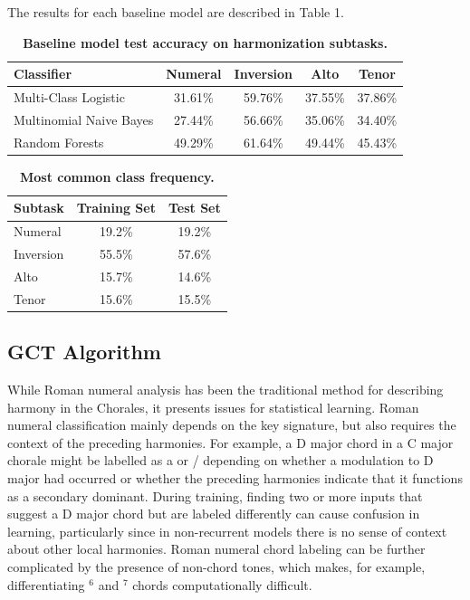 \documentclass[11pt]{article}
\begin{document}
The results for each baseline model are described in Table 1. \\

\begin{table}[h]
\begin{center}
\caption[Table caption text]{\textbf{Baseline model test accuracy on harmonization subtasks.}}
\begin{tabular}{l | c c c c}
Classifier & Numeral & Inversion & Alto & Tenor \\ \hline
Multi-Class Logistic & 31.61\% & 59.76\% & 37.55\% & 37.86\% \\
Multinomial Naive Bayes & 27.44\% & 56.66\% & 35.06\% & 34.40\% \\
Random Forests & 49.29\% & 61.64\% & 49.44\% & 45.43\% \\
\end{tabular}
\end{center}
\end{table}

\begin{table}[h]
\begin{center}
\caption[Table caption text]{\textbf{Most common class frequency.}}
\begin{tabular}{l | c c}
Subtask & Training Set & Test Set \\ \hline
Numeral & 19.2\% & 19.2\% \\
Inversion & 55.5\% & 57.6\% \\
Alto & 15.7\% & 14.6\% \\
Tenor & 15.6\% & 15.5\%
\end{tabular}
\end{center}
\end{table}


\subsection{GCT Algorithm}

While Roman numeral analysis has been the traditional method for describing harmony in the Chorales, it presents issues for statistical learning. Roman numeral classification mainly depends on the key signature, but also requires the context of the preceding harmonies. For example, a D major chord in a C major chorale might be labelled as a  or / depending on whether a modulation to D major had occurred or whether the preceding harmonies indicate that it functions as a secondary dominant. During training, finding two or more inputs that suggest a D major chord but are labeled differently can cause confusion in learning, particularly since in non-recurrent models there is no sense of context about other local harmonies. Roman numeral chord labeling can be further complicated by the presence of non-chord tones, which makes, for example, differentiating $^6$ and $^7$ chords computationally difficult.\\
\end{document}
